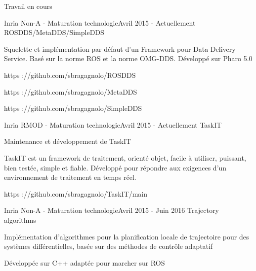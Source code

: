 \documentclass{resume} %
\begin{document}
\begin{rSection}{Travail en cours}
	\begin{rSubsection}{Inria Non-A - Maturation technologie}{Avril 2015 - Actuellement }{ROSDDS/MetaDDS/SimpleDDS}
		\item 		
		\item Squelette et impl\'{e}mentation par d\'{e}faut d'un Framework pour Data Delivery Service.  Bas\'{e} sur la norme ROS et la norme OMG-DDS. D\'{e}velopp\'{e} sur Pharo 5.0 
		\item https ://github.com/sbragagnolo/ROSDDS		
		\item https ://github.com/sbragagnolo/MetaDDS
		\item https ://github.com/sbragagnolo/SimpleDDS
	\end{rSubsection}
	\begin{rSubsection}{Inria RMOD - Maturation technologie}{Avril 2015 - Actuellement }{TaskIT}
		\item 	
		\item Maintenance et d\'{e}veloppement de TaskIT
		\item TaskIT est un framework de traitement, orient\'{e} objet, facile \`{a} utiliser, puissant, bien test\'{e}e, simple et fiable. D\'{e}velopp\'{e} pour r\'{e}pondre aux exigences d'un environnement de traitement en temps r\'{e}el.
		\item  https ://github.com/sbragagnolo/TaskIT/main
	\end{rSubsection}
	\begin{rSubsection}{Inria Non-A - Maturation technologie}{Avril 2015 - Juin 2016 }{Trajectory algorithms}
		\item 
		\item Impl\'{e}mentation d'algorithmes pour la planification locale de trajectoire pour des syst\`emes diff\'{e}rentielles, bas\'{e}e sur des m\'ethodes de contr\^ole adaptatif 
		\item D\'{e}velopp\'{e}e sur C++ adapt\'{e}e pour marcher sur ROS
	\end{rSubsection}
	
	

\end{rSection}
\end{document}
